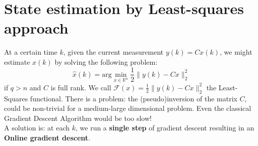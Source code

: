 \section{State estimation by Least-squares approach}
At a certain time $k$, given the current measurement $y(k)=Cx(k)$, we might estimate $x(k)$ by solving the following problem: 
\begin{equation}
	\hat{x}(k) = \text{arg}\min_{x\in\mathbb{R}^n} \frac{1}{2} 
	\lVert y(k)-Cx \rVert_2^2 
\end{equation}
if $q>n$ and $C$ is full rank. We call $\mathcal{F}(x) =\frac{1}{2} 
\lVert y(k)-Cx \rVert_2^2$ the Least-Squares functional. 
There is a problem: the (pseudo)inversion of the matrix $C$, could be non-trivial for a medium-large dimensional problem. Even the classical Gradient Descent Algorithm would be too slow!\\
A solution is: at each $k$, we run a \textbf{single step} of gradient descent resulting in an \textbf{Online gradient descent}.\\

